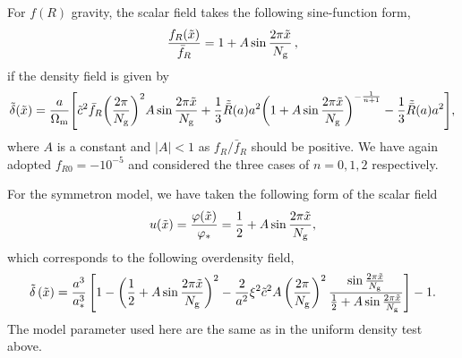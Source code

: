 For $f(R)$ gravity, the scalar field takes the following sine-function form, 
\begin{align}\label{eq:sine_field_fR}
    \frac{f_R(\tilde{x})}{\bar{f}_R} = 1 + A \sin\frac{2\pi \tilde{x}}{N_{\rm g}}\,,
\end{align}
if the density field is given by 
\begin{equation}
    \tilde{\delta}(\tilde{x}) = \frac{a}{\Omega_{\rm m}} \qty[\tilde{c}^2 \bar{f}_R \qty(\frac{2\pi}{N_{\rm g}})^2A \sin\frac{2\pi \tilde{x}}{N_{\rm g}} + \frac{1}{3} \tilde{\bar{R}}(a) a^2 \qty(1 + A \sin\frac{2 \pi \tilde{x}}{N_{\rm g}})^{-\frac{1}{n+1}} - \frac{1}{3} \tilde{\bar{R}}(a) a^2],
\end{equation}
where $A$ is a constant and $|A| < 1$ as $f_R/\bar{f}_R$ should be positive. We have again adopted $f_{R0}=-10^{-5}$ and considered the three cases of $n=0,1,2$ respectively. 

For the symmetron model, we have taken the following form of the scalar field
\begin{equation}\label{eq:sine_field_sym}
    u(\tilde{x}) = \frac{\varphi(\tilde{x})}{\varphi_\ast} = \frac{1}{2}+A\sin\frac{2\pi\tilde{x}}{N_{\rm g}},
\end{equation}
which corresponds to the following overdensity field,
\begin{equation}
    \tilde{\delta}\left(\tilde{x}\right) = \frac{a^3}{a^3_\ast}\left[1 - \left(\frac{1}{2}+A\sin\frac{2\pi\tilde{x}}{N_{\rm g}}\right)^2 - \frac{2}{a^2}\xi^2\tilde{c}^2A\left(\frac{2\pi}{N_{\rm g}}\right)^2\frac{\sin\frac{2\pi\tilde{x}}{N_{\rm g}}}{\frac{1}{2}+A\sin\frac{2\pi\tilde{x}}{N_{\rm g}}}\right]-1.
\end{equation}
The model parameter used here are the same as in the uniform density test above.

